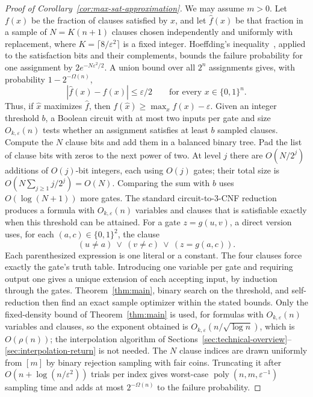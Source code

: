 \documentclass[11pt,reqno]{amsart}
\numberwithin{equation}{section}
\theoremstyle{definition}\newtheorem{definition}[theorem]{Definition}
\theoremstyle{remark}\newtheorem{remark}[theorem]{Remark}
\newcommand{\poly}{\operatorname{poly}}
\renewcommand{\le}{\leqslant}
\renewcommand{\ge}{\geqslant}
\begin{document}
\begin{proof}[Proof of Corollary~\ref{cor:max-sat-approximation}]
We may assume $m>0$.
Let $f(x)$ be the fraction of clauses satisfied by $x$, and let
$\widehat f(x)$ be that fraction in a sample of
$N=K(n+1)$ clauses chosen independently and uniformly with replacement,
where $K=\lceil8/\varepsilon^2\rceil$ is a fixed integer.
Hoeffding's inequality~\cite[Lemma~3.3]{AW15}, applied to the
satisfaction bits and their complements, bounds the failure
probability for one assignment by $2e^{-N\varepsilon^2/2}$.
A union bound over all $2^n$ assignments
gives, with probability $1-2^{-\Omega(n)}$,
\[
 |\widehat f(x)-f(x)|\le\varepsilon/2
 \qquad\text{for every }x\in\{0,1\}^n.
\]
Thus, if $\widehat x$ maximizes $\widehat f$, then
$f(\widehat x)\ge\max_x f(x)-\varepsilon$.
Given an integer threshold $b$, a Boolean circuit with at most two
inputs per gate and size $O_{k,\varepsilon}(n)$ tests whether an
assignment satisfies at least $b$ sampled clauses.
Compute the $N$ clause bits and add them in a balanced binary tree.
Pad the list of clause bits with zeros to the next power of two.
At level $j$ there are $O(N/2^j)$ additions of $O(j)$-bit integers,
each using $O(j)$ gates; their total size is
$O(N\sum_{j\ge1}j/2^j)=O(N)$. Comparing the sum with $b$ uses
$O(\log(N+1))$ more gates.
The standard circuit-to-$3$-CNF reduction~\cite[Lemmas~15.9--15.10]{Bar23}
produces a formula with $O_{k,\varepsilon}(n)$ variables and clauses
that is satisfiable exactly when this threshold can be attained.
For a gate $z=g(u,v)$, a direct version uses, for each
$(a,c)\in\{0,1\}^2$, the clause
\begin{equation}\label{eq:gate-truth-table-encoding}
 (u\ne a)\ \vee\ (v\ne c)\ \vee\ (z=g(a,c)).
\end{equation}
Each parenthesized expression is one literal or a constant.
The four clauses force exactly the gate's truth table. Introducing
one variable per gate and requiring output one gives a unique
extension of each accepting input, by induction through the gates.
Theorem~\ref{thm:main}, binary search on the threshold, and
self-reduction then find an exact sample optimizer within the stated bounds.
Only the fixed-density bound of Theorem~\ref{thm:main} is used, for
formulas with $O_{k,\varepsilon}(n)$ variables and clauses, so the
exponent obtained is $O_{k,\varepsilon}(n/\sqrt{\log n})$, which is
$O(\rho(n))$; the interpolation algorithm of
Sections~\ref{sec:technical-overview}--\ref{sec:interpolation-return}
is not needed.
The $N$ clause indices are drawn uniformly from $[m]$ by binary
rejection sampling with fair coins. Truncating it after
$O(n+\log(n/\varepsilon^2))$ trials per index gives worst-case
$\poly(n,m,\varepsilon^{-1})$
sampling time and adds
at most $2^{-\Omega(n)}$ to the failure probability.
\end{proof}
\end{document}
